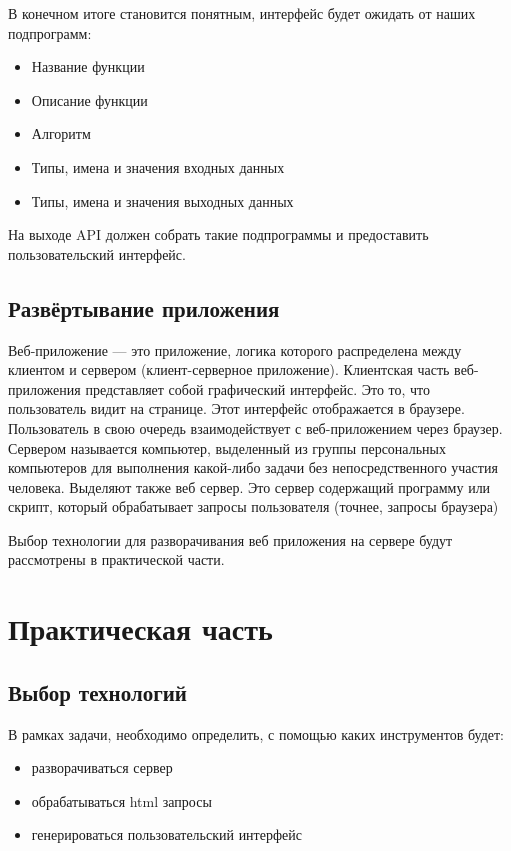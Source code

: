 \documentclass[14pt,a4paper]{scrartcl}
\begin{document}
    В конечном итоге становится понятным, интерфейс будет ожидать от наших подпрограмм:
    \begin{itemize}
        \item Название функции
        \item Описание функции
        \item Алгоритм
        \item Типы, имена и значения входных данных
        \item Типы, имена и значения выходных данных
    \end{itemize}
    На выходе API должен собрать такие подпрограммы и предоставить пользовательский интерфейс.

    \subsection[Развёртывание приложения]{Развёртывание приложения}
    Веб-приложение — это приложение, логика которого распределена между клиентом и сервером (клиент-серверное приложение)\cite{Web-app-wiki}. Клиентская часть веб-приложения представляет собой графический интерфейс. Это то, что пользователь видит на странице. Этот интерфейс отображается в браузере. Пользователь в свою очередь взаимодействует с веб-приложением через браузер. Сервером называется компьютер, выделенный из группы персональных компьютеров для выполнения какой-либо задачи без непосредственного участия человека\cite{Server}. Выделяют также веб сервер. Это сервер содержащий программу или скрипт, который обрабатывает запросы пользователя (точнее, запросы браузера)\cite{Web-app-struct}

    Выбор технологии для разворачивания веб приложения на сервере будут рассмотрены в практической части.

    \newpage
    \section[Практическая часть]{Практическая часть}
    \subsection[Выбор технологий]{Выбор технологий}
    В рамках задачи, необходимо определить, с помощью каких инструментов будет:
    \begin{itemize}
        \item разворачиваться сервер
        \item обрабатываться html запросы
        \item генерироваться пользовательский интерфейс
    \end{itemize}
\end{document}
